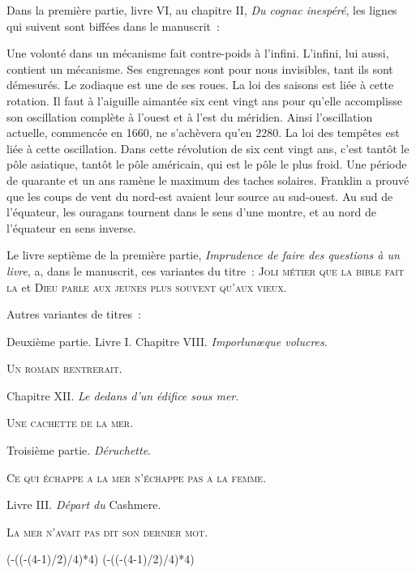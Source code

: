 \documentclass[french,twoside]{book} %
\def\mednobreak{\ifdim\lastskip<\medskipamount
  \removelastskip\nopagebreak\medskip\fi}
\newcommand{\labelblock}[1]{\medbreak{\noindent\color{rubric}\bfseries #1}\par\mednobreak}
\def\truncdiv#1#2{((#1-(#2-1)/2)/#2)}
\def\moduloop#1#2{(#1-\truncdiv{#1}{#2}*#2)}
\def\modulo#1#2{\number\numexpr\moduloop{#1}{#2}\relax}
\begin{document}
\labelblock{NOTE II.}

\noindent Dans la première partie, livre VI, au chapitre II, \emph{Du cognac inespéré}, les lignes qui suivent sont biffées dans le manuscrit :\par
\bigbreak
\noindent Une volonté dans un mécanisme fait contre-poids à l’infini. L’infini, lui aussi, contient un mécanisme. Ses engrenages sont pour nous invisibles, tant ils sont démesurés. Le zodiaque est une de ses roues. La loi des saisons est liée à cette rotation. Il faut à l’aiguille aimantée six cent vingt ans pour qu’elle accomplisse son oscillation complète à l’ouest et à l’est du méridien. Ainsi l’oscillation actuelle, commencée en 1660, ne s’achèvera qu’en 2280. La loi des tempêtes est liée à cette oscillation. Dans cette révolution de six cent vingt ans, c’est tantôt le pôle asiatique, tantôt le pôle américain, qui est le pôle le plus froid. Une période de quarante et un ans ramène le maximum des taches solaires. Franklin a prouvé que les coups de vent du nord-est avaient leur source au sud-ouest. Au sud de l’équateur, les ouragans tournent dans le sens d’une montre, et au nord de l’équateur en sens inverse.\par

\labelblock{NOTE III.}

\noindent Le livre septième de la première partie, \emph{Imprudence de faire des questions à un livre}, a, dans le manuscrit, ces variantes du titre : J{\scshape oli métier que la bible fait la} et D{\scshape ieu parle aux jeunes plus souvent qu’aux vieux}.\par
\bigbreak
\noindent Autres variantes de titres :\par
Deuxième partie. Livre I. Chapitre VIII. \emph{Imporlunœque volucres}.\par
U{\scshape n romain rentrerait}.\par
 Chapitre XII. \emph{Le dedans d’un édifice sous mer}.\par
U{\scshape ne cachette de la mer}.\par
Troisième partie. \emph{Déruchette}.\par
C{\scshape e qui échappe a la mer n’échappe pas a la femme}.\par
Livre III. \emph{Départ du} Cashmere.\par
L{\scshape a mer n’avait pas dit son dernier mot}.
 


\ifbooklet
  \pagestyle{empty}
  \clearpage
  \ifnum\modulo{\value{page}}{4}=0 \hbox{}\newpage\hbox{}\newpage\fi
  \ifnum\modulo{\value{page}}{4}=1 \hbox{}\newpage\hbox{}\newpage\fi
\end{document}
